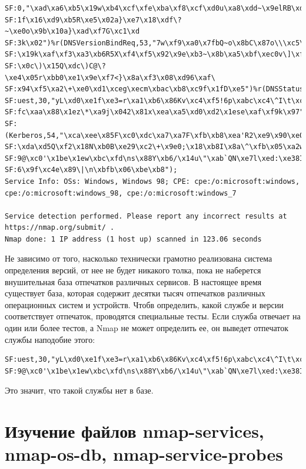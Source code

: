 \documentclass[12pt,a4paper]{report}
\begin{document}
\begin{lstlisting}[breaklines]
SF:0,"\xad\xa6\xb5\x19w\xb4\xcf\xfe\xba\xf8\xcf\xd0u\xa8\xdd~\x9elRB\xdd\x
SF:1f\x16\xd9\xb5R\xe5\x02a}\xe7\x18\xdf\?~\xe0o\x9b\x10a}\xad\xf7G\xc1\xd
SF:3k\x02")%r(DNSVersionBindReq,53,"7w\xf9\xa0\x7fbQ~o\x8bC\x87o\\\xc5\xfd
SF:\x19k\xaf\xf3\xa3\xb6R5X\xf4\xf5\x92\x9e\xb3~\x8b\xa5\xbf\xec0v\]\xf2\$
SF:\x0c\)\x15Q\xdc\)C@\?\xe4\x05r\xbb0\xe1\x9e\xf7<}\x8a\xf3\x08\xd96\xaf\
SF:x94\xf5\xa2\+\xe0\xd1\xceg\xecm\xbac\xb8\xc9f\x1fD\xe5")%r(DNSStatusReq
SF:uest,30,"yL\xd0\xe1f\xe3=r\xa1\xb6\x86Kv\xc4\xf5!6p\xabc\xc4\^I\t\xca\x
SF:fc\xaa\x88\x1ez\*\xa9j\x042\x81x\xea\xa5\xd0\xd2\x1ese\xaf\xf9k\x97")%r
SF:(Kerberos,54,"\xca\xee\x85F\xc0\xdc\xa7\xa7F\xfb\xb8\xea'R2\xe9\x90\xe0
SF:\xda\xd5Q\xf2\x18N\xb0B\xe29\xc2\+\x9e0;\x18\xb8I\x8a\^\xfb\x05\xa2w\xb
SF:9@\xc0'\x1be\x1ew\xbc\xfd\ns\x88Y\xb6/\x14u\"\xab`QN\xe7l\xed:\xe38I\xe
SF:6\x9f\xc4e\x89\|\n\xbfb\x06\xbe\xb8");
Service Info: OSs: Windows, Windows 98; CPE: cpe:/o:microsoft:windows, cpe:/o:microsoft:windows_98, cpe:/o:microsoft:windows_7

Service detection performed. Please report any incorrect results at https://nmap.org/submit/ .
Nmap done: 1 IP address (1 host up) scanned in 123.06 seconds
\end{lstlisting}

Не зависимо от того, насколько технически грамотно реализована система определения версий, от нее не будет никакого толка, пока не наберется внушительная база отпечатков различных сервисов. В настоящее время существует база, которая содержит десятки тысяч отпечатков различных операционных систем и устройств. Чтобв определить, какой службе и версии соответствует отпечаток, проводятся специальные тесты.
Если служба отвечает на один или более тестов, а Nmap не может определить ее, он выведет отпечаток службы наподобие этого:
\begin{lstlisting}[breaklines]
SF:uest,30,"yL\xd0\xe1f\xe3=r\xa1\xb6\x86Kv\xc4\xf5!6p\xabc\xc4\^I\t\xca\x
SF:9@\xc0'\x1be\x1ew\xbc\xfd\ns\x88Y\xb6/\x14u\"\xab`QN\xe7l\xed:\xe38I\xe
\end{lstlisting}
Это значит, что такой службы нет в базе.




\section*{Изучение файлов nmap-services, nmap-os-db, nmap-service-probes}
\end{document}
